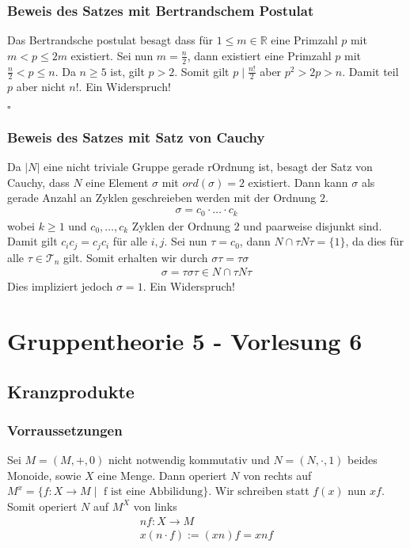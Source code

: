 \documentclass[12pt, german]{article}
\newcommand{\bewiesen}{
	
	\begin{flushright}
		$\square$  \\
\end{flushright}}
\begin{document}
	\subsubsection{Beweis des Satzes mit Bertrandschem Postulat}
	Das Bertrandsche postulat besagt dass für $1 \leq m \in \mathbb R$ eine Primzahl $p$ mit $m < p \leq 2m$ existiert. 
	\newline
	Sei nun $m =\frac{n}{2}$, dann existiert eine Primzahl $p$ mit $\frac{n}{2} < p \leq n$. Da $n \geq 5$ ist, gilt $p > 2$. Somit gilt $p \mid \frac{n!}{2}$ aber $p^2 > 2p >  n$. Damit teil $p$ aber nicht $n!$. Ein Widerspruch!
	\bewiesen
	
	\subsubsection{Beweis des Satzes mit Satz von Cauchy}
	Da $|N|$ eine nicht triviale Gruppe gerade rOrdnung ist, besagt der Satz von Cauchy, dass $N$ eine Element $\sigma$ mit $ord(\sigma) = 2$ existiert. 
	Dann kann $\sigma$ als gerade Anzahl an Zyklen geschreieben werden mit der Ordnung $2$. 
	\begin{align*}
		\sigma = c_0 \cdot \ldots \cdot c_k
	\end{align*} 
	wobei $k\geq 1$ und $c_0, \ldots, c_k$ Zyklen der Ordnung $2$ und paarweise disjunkt sind. Damit gilt $c_ic_j = c_jc_i$ für alle $i,j$. 
	Sei nun $\tau = c_0$, dann $N \cap \tau N \tau = \{1\}$, da dies für alle $\tau \in \mathcal T_n$ gilt. Somit erhalten wir durch $\sigma\tau = \tau \sigma$
	\begin{align*}
		\sigma = \tau\sigma\tau \in N\cap \tau N \tau
	\end{align*} 
	Dies impliziert jedoch $\sigma = 1$. Ein Widerspruch! 
	
	\section{Gruppentheorie 5 - Vorlesung 6}
	\subsection{Kranzprodukte}
	\subsubsection{Vorraussetzungen}
	Sei $M = (M, +, 0)$ nicht notwendig kommutativ und $N=(N, \cdot, 1)$ beides Monoide, sowie $X$ eine Menge. 
	Dann operiert $N$ von rechts auf $M^x = \{ f: X \to M \mid \text{ f ist eine Abbilidung} \}$. Wir schreiben statt $f(x)$ nun $xf$. 
	Somit operiert $N$ auf $M^X$ von links 
	\begin{align*}
		nf : X \to M \\ 
		x(n\cdot f) := (xn)f = xnf 
	\end{align*}
\end{document}
